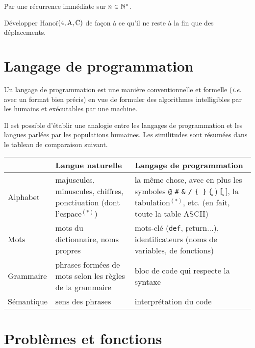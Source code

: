 		\begin{Preuve}
			Par une récurrence immédiate sur \(n\in\bb{N}^*\).
		\end{Preuve}
	
		\begin{Exercice}
			Développer \textsf{Hanoï}\((4,\rm{A},\rm{C})\) de façon à ce qu'il ne reste à la fin que des déplacements.
		\end{Exercice}
	
\section{Langage de programmation}
	
	\begin{Definition}
		Un langage de programmation est une manière conventionnelle et formelle (\emph{i.e.} avec un format bien précis) en vue de formuler des algorithmes intelligibles par les humains et exécutables par une machine.
	\end{Definition}
	
	\renewcommand{\arraystretch}{1.2}
	Il est possible d'établir une analogie entre les langages de programmation et les langues parlées par les populations humaines. Les similitudes sont résumées dans le tableau de comparaison suivant. \\[3mm]
	\begin{tabular}{l|p{68mm}|p{75mm}}
		& Langue naturelle & Langage de programmation \\ \hline
		Alphabet & \raggedright majuscules, minuscules, chiffres, ponctiuation (dont l'espace$^{(*)}$) & la même chose, avec en plus les symboles \texttt{@} \texttt{\#} \texttt{\&} \texttt{/} \texttt{\{ \}} \c{( )} \c{[ ]}, la tabulation$^{(*)}$, etc. (en fait, toute la table ASCII) \\ \hline
		Mots & mots du dictionnaire, noms propres & mots-clé (\texttt{def}, \c{return}...), identificateurs (noms de variables, de fonctions) \\ \hline
		Grammaire & \raggedright phrases formées de mots selon les règles de la grammaire & bloc de code qui respecte la syntaxe \\ \hline
		Sémantique & sens des phrases & interprétation du code
	\end{tabular}
	
	\pagebreak
	
\section{Problèmes et fonctions}

